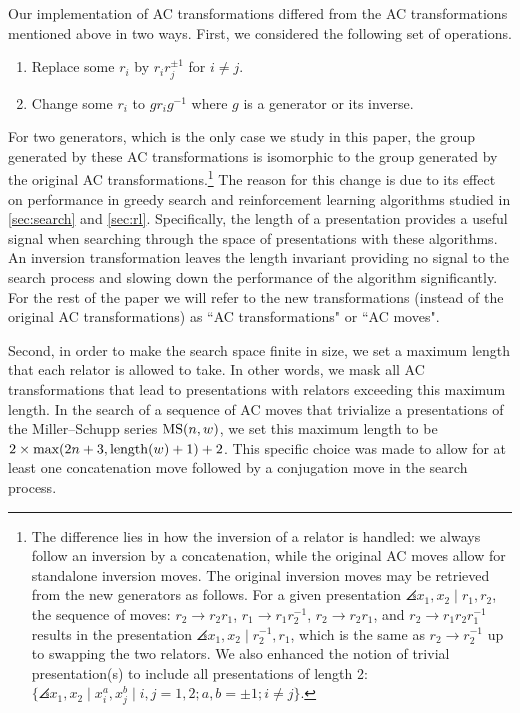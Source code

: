 Our implementation of AC transformations differed from the AC transformations mentioned above in two ways.
First, we considered the following set of operations.
\begin{enumerate}[label=(AC$'$\arabic*)]
	\item Replace some $r_i$ by $r_i r_j^{\pm 1}$ for $i \neq j$.
	\item Change some $r_i$ to $g r_i g^{-1}$ where $g$ is a generator or its inverse.
\end{enumerate}
For two generators, which is the only case we study in this paper, the group generated by these AC transformations is isomorphic to the group generated by the original AC transformations.\footnote{
The difference lies in how the inversion of a relator is handled: we always follow an inversion by a concatenation, while the original AC moves allow for standalone inversion moves.
The original inversion moves may be retrieved from the new generators as follows.
For a given presentation $\angles{x_1, x_2 \mid r_1, r_2}$, the sequence of moves: $r_2 \to r_2 r_1$, $r_1 \to r_1 r_2^{-1}$, $r_2 \to r_2 r_1$, and $r_2 \to r_1 r_2 r_1^{-1}$ results in the presentation $\angles{x_1, x_2 \mid r_2^{-1}, r_1}$, which is the same as $r_2 \to r_2^{-1}$ up to swapping the two relators.
We also enhanced the notion of trivial presentation(s) to include all presentations of length 2: $\{\angles{x_1, x_2 \mid x_i^{a}, x_j^{b}}  \mid i, j = 1, 2; a, b = \pm 1; i \neq j \}$.
}
The reason for this change is due to its effect on performance in greedy search and reinforcement learning algorithms studied in \autoref{sec:search} and \autoref{sec:rl}.
Specifically, the length of a presentation provides a useful signal when searching through the space of presentations with these algorithms.
An inversion transformation leaves the length invariant providing no signal to the search process and slowing down the performance of the algorithm significantly.
For the rest of the paper we will refer to the new transformations (instead of the original AC transformations) as ``AC transformations" or ``AC moves".

Second, in order to make the search space finite in size, we set a maximum length that each relator is allowed to take. In other words, we mask all AC transformations that lead to presentations with relators exceeding this maximum length.
In the search of a sequence of AC moves that trivialize a presentations of the Miller--Schupp series $\text{MS}(n, w)$, we set this maximum length to be $2 \times \text{max}(2 n+3, \operatorname{length}(w)+1) + 2$.
This specific choice was made to allow for at least one concatenation move followed by a conjugation move in the search process.
